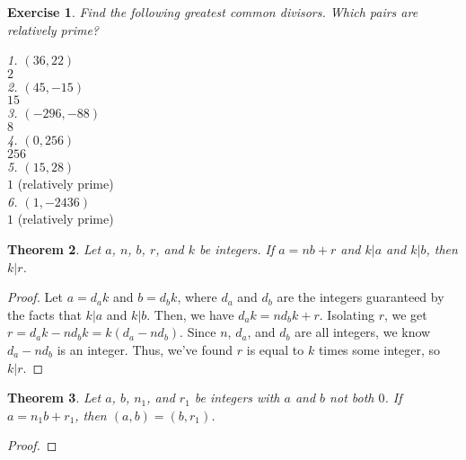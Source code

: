 \documentclass{article}
\newtheorem{thm}{Theorem}[section]
\newtheorem{ex}[thm]{Exercise}
\numberwithin{equation}{thm}
\begin{document}
\begin{ex} \label{1.32}
  Find the following greatest common divisors. Which pairs are relatively prime?
\end{ex}

\hspace*{5mm} \emph{1. $(36, 22)$} \\
\hspace*{15mm} $2$ \\

\hspace*{5mm} \emph{2. $(45, -15)$} \\
\hspace*{15mm} $15$ \\

\hspace*{5mm} \emph{3. $(-296, -88)$} \\
\hspace*{15mm} $8$ \\

\hspace*{5mm} \emph{4. $(0, 256)$} \\
\hspace*{15mm} $256$ \\

\hspace*{5mm} \emph{5. $(15, 28)$} \\
\hspace*{15mm} $1$ (relatively prime) \\

\hspace*{5mm} \emph{6. $(1, -2436)$} \\
\hspace*{15mm} $1$ (relatively prime) \\



\begin{thm} \label{1.32}
  Let $a$, $n$, $b$, $r$, and $k$ be integers. If $a = nb + r$ and $k|a$ and $k|b$, then $k|r$.
\end{thm}

\begin{proof}
  Let $a = d_ak$ and $b=d_bk$, where $d_a$ and $d_b$ are the integers guaranteed by the facts that $k|a$ and $k|b$.
  Then, we have $d_ak = nd_bk + r$. Isolating $r$, we get $r = d_ak - nd_bk = k(d_a - nd_b)$. Since $n$, $d_a$, and $d_b$ are all integers, we know $d_a - nd_b$ is an integer. Thus, we've found $r$ is equal to $k$ times some integer, so $k|r$.
\end{proof}



\pagebreak



\begin{thm} \label{1.33}
  Let $a$, $b$, $n_1$, and $r_1$ be integers with $a$ and $b$ not both $0$. If $a = n_1b + r_1$, then $(a,b) = (b,r_1)$.
\end{thm}

\begin{proof}
  
\end{proof}
\end{document}
